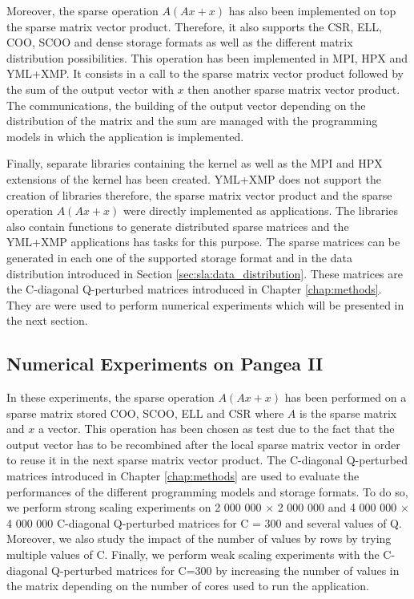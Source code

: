 Moreover, the sparse operation $A(Ax+x)$ has also been implemented on top the sparse matrix vector product.
Therefore, it also supports the CSR, ELL, COO, SCOO and dense storage formats as well as the different matrix distribution possibilities.
This operation has been implemented in MPI, HPX and YML+XMP.
It consists in a call to the sparse matrix vector product followed by the sum of the output vector with $x$ then another sparse matrix vector product.
The communications, the building of the output vector depending on the distribution of the matrix and the sum are managed with the programming models in which the application is implemented.

Finally, separate libraries containing the kernel as well as the MPI and HPX extensions of the kernel has been created.
YML+XMP does not support the creation of libraries therefore, the sparse matrix vector product and the sparse operation $A(Ax+x)$ were directly implemented as applications.
The libraries also contain functions to generate distributed sparse matrices and the YML+XMP applications has tasks for this purpose.
The sparse matrices can be generated in each one of the supported storage format and in the data distribution introduced in Section \ref{sec:sla:data_distribution}.
These matrices are the C-diagonal Q-perturbed matrices introduced in Chapter \ref{chap:methods}.
They are were used to perform numerical experiments which will be presented in the next section.


\subsection{Numerical Experiments on Pangea II}
In these experiments, the sparse operation $A(Ax+x)$ has been performed on a sparse matrix stored COO, SCOO, ELL and CSR where $A$ is the sparse matrix and $x$ a vector.
This operation has been chosen as test due to the fact that the output vector has to be recombined after the local sparse matrix vector in order to reuse it in the next sparse matrix vector product.
The C-diagonal Q-perturbed matrices introduced in Chapter \ref{chap:methods} are used to evaluate the performances of the different programming models and storage formats.
To do so, we perform strong scaling experiments on 2 000 000 $\times$ 2 000 000 and 4 000 000 $\times$ 4 000 000 C-diagonal Q-perturbed matrices for C = 300 and several values of Q.
Moreover, we also study the impact of the number of values by rows by trying multiple values of C.
Finally, we perform weak scaling experiments with the C-diagonal Q-perturbed matrices for C=300 by increasing the number of values in the matrix depending on the number of cores used to run the application.

